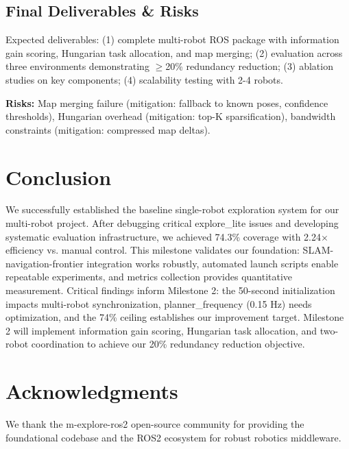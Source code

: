 \documentclass[conference]{IEEEtran}
\begin{document}
\subsection{Final Deliverables \& Risks}

Expected deliverables: (1) complete multi-robot ROS package with information gain scoring, Hungarian task allocation, and map merging; (2) evaluation across three environments demonstrating $\geq$20\% redundancy reduction; (3) ablation studies on key components; (4) scalability testing with 2-4 robots.

\textbf{Risks:} Map merging failure (mitigation: fallback to known poses, confidence thresholds), Hungarian overhead (mitigation: top-K sparsification), bandwidth constraints (mitigation: compressed map deltas).

\section{Conclusion}

We successfully established the baseline single-robot exploration system for our multi-robot project. After debugging critical explore\_lite issues and developing systematic evaluation infrastructure, we achieved 74.3\% coverage with 2.24$\times$ efficiency vs. manual control. This milestone validates our foundation: SLAM-navigation-frontier integration works robustly, automated launch scripts enable repeatable experiments, and metrics collection provides quantitative measurement. Critical findings inform Milestone 2: the 50-second initialization impacts multi-robot synchronization, planner\_frequency (0.15 Hz) needs optimization, and the 74\% ceiling establishes our improvement target. Milestone 2 will implement information gain scoring, Hungarian task allocation, and two-robot coordination to achieve our 20\% redundancy reduction objective.

\section*{Acknowledgments}

We thank the m-explore-ros2 open-source community for providing the foundational codebase and the ROS2 ecosystem for robust robotics middleware.
\end{document}
